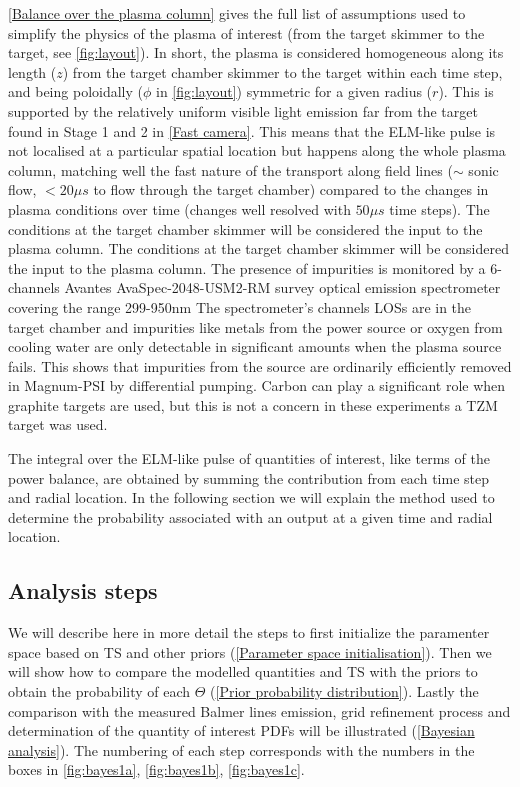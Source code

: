 \autoref{Balance over the plasma column} gives the full list of assumptions used to simplify the physics of the plasma of interest (from the target skimmer to the target, see \autoref{fig:layout}). In short, the plasma is considered homogeneous along its length ($z$) from the target chamber skimmer to the target within each time step, and being poloidally ($\phi$ in \autoref{fig:layout}) symmetric for a given radius ($r$). This is supported by the relatively uniform visible light emission far from the target found in Stage 1 and 2 in \autoref{Fast camera}. This means that the ELM-like pulse is not localised at a particular spatial location but happens along the whole plasma column, matching well the fast nature of the transport along field lines ($\sim$ sonic flow, $<20 \mu s$ to flow through the target chamber) compared to the changes in plasma conditions over time (changes well resolved with $50 \mu s$ time steps). The conditions at the target chamber skimmer will be considered the input to the plasma column. The conditions at the target chamber skimmer will be considered the input to the plasma column. The presence of impurities is monitored by a 6-channels Avantes AvaSpec-2048-USM2-RM survey optical emission spectrometer covering the range 299-950nm\cite{Science2017} The spectrometer's channels LOSs are in the target chamber and impurities like metals from the power source or oxygen from cooling water are only detectable in significant amounts when the plasma source fails. This shows that impurities from the source are ordinarily efficiently removed in Magnum-PSI by differential pumping. Carbon can play a significant role when graphite targets are used\cite{VanEck2013}, but this is not a concern in these experiments a TZM target was used.

The integral over the ELM-like pulse of quantities of interest, like terms of the power balance, are obtained by summing the contribution from each time step and radial location. In the following section we will explain the method used to determine the probability associated with an output at a given time and radial location.

\subsection{Analysis steps}\label{Analysis steps}

We will describe here in more detail the steps to first initialize the paramenter space based on TS and other priors (\autoref{Parameter space initialisation}). Then we will show how to compare the modelled quantities and TS with the priors to  obtain the probability of each $\Theta$ (\autoref{Prior probability distribution}). Lastly the comparison with the measured Balmer lines emission, grid refinement process and determination of the quantity of interest PDFs will be illustrated (\autoref{Bayesian analysis}). The numbering of each step corresponds with the numbers in the boxes in \autoref{fig:bayes1a}, \ref{fig:bayes1b}, \ref{fig:bayes1c}.

